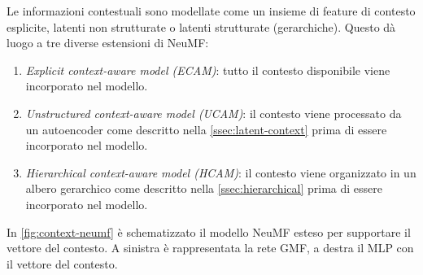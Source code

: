 Le informazioni contestuali sono modellate come un insieme di feature di contesto esplicite, latenti non strutturate o latenti strutturate (gerarchiche). Questo dà luogo a tre diverse estensioni di NeuMF:
\begin{enumerate}
 \item \textit{Explicit context-aware model (ECAM)}: tutto il contesto disponibile viene incorporato nel modello.
 \item \textit{Unstructured context-aware model (UCAM)}: il contesto viene processato da un autoencoder \cite{latent-context} come descritto nella \autoref{ssec:latent-context} prima di essere incorporato nel modello.
 \item \textit{Hierarchical context-aware model (HCAM)}: il contesto viene organizzato in un albero gerarchico \cite{hierarchical-context} come descritto nella \autoref{ssec:hierarchical} prima di essere incorporato nel modello.
\end{enumerate}
In \autoref{fig:context-neumf} è schematizzato il modello NeuMF  esteso per supportare il vettore del contesto. A sinistra è rappresentata la rete GMF, a destra il MLP con il vettore del contesto.



